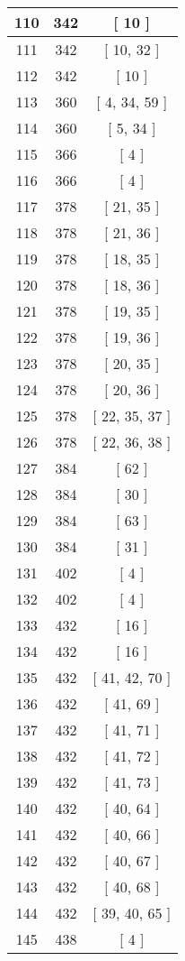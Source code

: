 \begin{center}
\begin{longtable}[H]{|| c c c ||}
\hline
110 & 342 & [ 10 ] \\ 
\hline
111 & 342 & [ 10, 32 ] \\ 
\hline
112 & 342 & [ 10 ] \\ 
\hline
113 & 360 & [ 4, 34, 59 ] \\ 
\hline
114 & 360 & [ 5, 34 ] \\ 
\hline
115 & 366 & [ 4 ] \\ 
\hline
116 & 366 & [ 4 ] \\ 
\hline
117 & 378 & [ 21, 35 ] \\ 
\hline
118 & 378 & [ 21, 36 ] \\ 
\hline
119 & 378 & [ 18, 35 ] \\ 
\hline
120 & 378 & [ 18, 36 ] \\ 
\hline
121 & 378 & [ 19, 35 ] \\ 
\hline
122 & 378 & [ 19, 36 ] \\ 
\hline
123 & 378 & [ 20, 35 ] \\ 
\hline
124 & 378 & [ 20, 36 ] \\ 
\hline
125 & 378 & [ 22, 35, 37 ] \\ 
\hline
126 & 378 & [ 22, 36, 38 ] \\ 
\hline
127 & 384 & [ 62 ] \\ 
\hline
128 & 384 & [ 30 ] \\ 
\hline
129 & 384 & [ 63 ] \\ 
\hline
130 & 384 & [ 31 ] \\ 
\hline
131 & 402 & [ 4 ] \\ 
\hline
132 & 402 & [ 4 ] \\ 
\hline
133 & 432 & [ 16 ] \\ 
\hline
134 & 432 & [ 16 ] \\ 
\hline
135 & 432 & [ 41, 42, 70 ] \\ 
\hline
136 & 432 & [ 41, 69 ] \\ 
\hline
137 & 432 & [ 41, 71 ] \\ 
\hline
138 & 432 & [ 41, 72 ] \\ 
\hline
139 & 432 & [ 41, 73 ] \\ 
\hline
140 & 432 & [ 40, 64 ] \\ 
\hline
141 & 432 & [ 40, 66 ] \\ 
\hline
142 & 432 & [ 40, 67 ] \\ 
\hline
143 & 432 & [ 40, 68 ] \\ 
\hline
144 & 432 & [ 39, 40, 65 ] \\ 
\hline
145 & 438 & [ 4 ] \\ 

\end{longtable}
\end{center}
